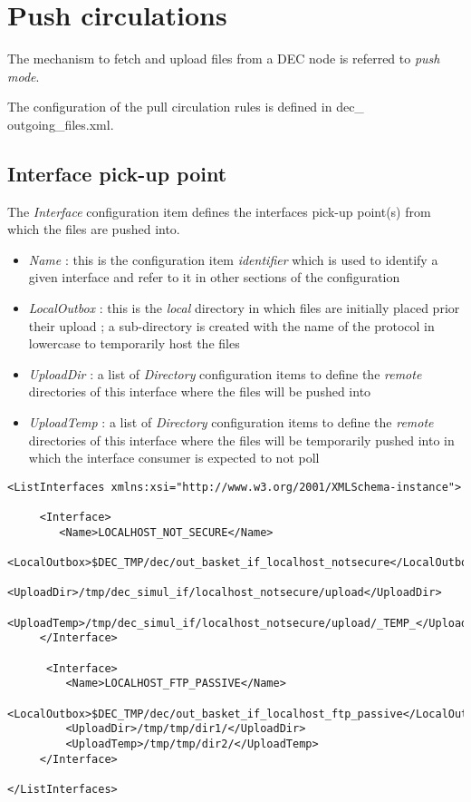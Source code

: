 \documentclass[dec_sum_main.tex]{subfiles}
\begin{document}


\newpage	
\section{Push circulations}

The mechanism to fetch and upload files from a DEC node is referred to \textit{push mode}.

The configuration of the pull circulation rules is defined in dec\_ outgoing\_files.xml.

\subsection{Interface pick-up point}
The \textit{Interface} configuration item defines the interfaces pick-up point(s) from which the files are pushed into.
\label{LocalOutbox}
\label{UploadDir}
\label{UploadTemp}
\begin{itemize}
	\item \textit{Name} : this is the configuration item \textit{identifier} which is used to identify a given interface and refer to it in other sections of the configuration
	\item \textit{LocalOutbox} : this is the \textit{local} directory in which files are initially placed prior their upload ; a sub-directory is created with the name of the protocol in lowercase to temporarily host the files
	\item \textit{UploadDir} : a list of \textit{Directory} configuration items to define the \textit{remote} directories of this interface where the files will be pushed into
	\item \textit{UploadTemp} : a list of \textit{Directory} configuration items to define the \textit{remote} directories of this interface where the files will be temporarily pushed into in which the interface consumer is expected to not poll
\end{itemize}


\begin{lstlisting}
<ListInterfaces xmlns:xsi="http://www.w3.org/2001/XMLSchema-instance">
	
     <Interface>
        <Name>LOCALHOST_NOT_SECURE</Name>
        <LocalOutbox>$DEC_TMP/dec/out_basket_if_localhost_notsecure</LocalOutbox>
        <UploadDir>/tmp/dec_simul_if/localhost_notsecure/upload</UploadDir>
        <UploadTemp>/tmp/dec_simul_if/localhost_notsecure/upload/_TEMP_</UploadTemp>
     </Interface>

      <Interface>
	     <Name>LOCALHOST_FTP_PASSIVE</Name>
         <LocalOutbox>$DEC_TMP/dec/out_basket_if_localhost_ftp_passive</LocalOutbox>
         <UploadDir>/tmp/tmp/dir1/</UploadDir>
         <UploadTemp>/tmp/tmp/dir2/</UploadTemp>
     </Interface>

</ListInterfaces>
\end{lstlisting}
\end{document}
